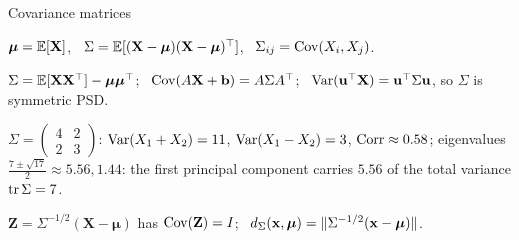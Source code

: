\documentclass[aspectratio=1610,11pt]{beamer}
\begin{document}
\begin{frame}{Covariance matrices}
    \begin{definition}
        \small $\boldsymbol{\mu} = \mathbb{E}[\mathbf{X}]$, \ $\Sigma = \mathbb{E}[(\mathbf{X} - \boldsymbol{\mu})(\mathbf{X} - \boldsymbol{\mu})^\top]$, \ $\Sigma_{ij} = \operatorname{Cov}(X_i, X_j)$.
    \end{definition}
    \begin{proposition}
        \small $\Sigma = \mathbb{E}[\mathbf{X}\mathbf{X}^\top] - \boldsymbol{\mu}\boldsymbol{\mu}^\top$; \ $\operatorname{Cov}(A\mathbf{X} + \mathbf{b}) = A\Sigma A^\top$; \ $\operatorname{Var}(\mathbf{u}^\top\mathbf{X}) = \mathbf{u}^\top\Sigma\mathbf{u}$, so $\Sigma$ is symmetric PSD.
    \end{proposition}
    \begin{example}
        \small $\Sigma = \begin{pmatrix} 4 & 2 \\ 2 & 3 \end{pmatrix}$: $\operatorname{Var}(X_1 + X_2) = 11$, $\operatorname{Var}(X_1 - X_2) = 3$, $\operatorname{Corr} \approx 0.58$; eigenvalues $\frac{7 \pm \sqrt{17}}{2} \approx 5.56, 1.44$: the first principal component carries $5.56$ of the total variance $\operatorname{tr}\Sigma = 7$.
    \end{example}
    \begin{definition}
        \small $\mathbf{Z} = \Sigma^{-1/2}(\mathbf{X} - \boldsymbol{\mu})$ has $\operatorname{Cov}(\mathbf{Z}) = I$; \ $d_\Sigma(\mathbf{x}, \boldsymbol{\mu}) = \lVert \Sigma^{-1/2}(\mathbf{x} - \boldsymbol{\mu}) \rVert$.
    \end{definition}
\end{frame}

\end{document}
